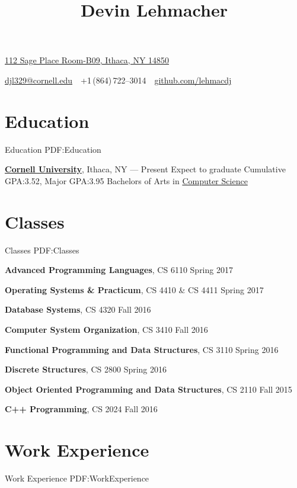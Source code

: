 \documentclass[letterpaper,10pt,oneside]{simpleresume}
\newcommand{\CVAuthor}{Devin Lehmacher}
\newcommand{\CVWebpage}{github.com/lehmacdj}
\begin{document}
\begin{minipage}[t][0pt]{\linewidth}
\pagestyle{empty}

\title{\CVAuthor}

\begin{subtitle}
\href{https://www.google.com/maps/place/112+Sage+Pl+Room-B09,+Ithaca,+NY+14850}
{112 Sage Place Room-B09, Ithaca, NY 14850}
\par
\href{mailto:djl329@cornell.edu}
{djl329@cornell.edu}
\,\SubBulletSymbol\,
+1\,(864)\,722--3014
\,\SubBulletSymbol\,
\href{https://\CVWebpage}
{\CVWebpage}
\end{subtitle}

\begin{body}

\section%
{Education}
{Education}
{PDF:Education}

\href{https://www.cornell.edu}
{\textbf{Cornell University}}, Ithaca, NY
\hfill
{} --- Present
\BulletItem%
Expect to graduate 
\BulletItem%
Cumulative GPA:\@ 3.52, Major GPA:\@ 3.95
\BulletItem%
Bachelors of Arts in
\href{https://www.cs.cornell.edu}{Computer Science}

\section%
{Classes}
{Classes}
{PDF:Classes}

\textbf{Advanced Programming Languages}, CS 6110
\hfill Spring 2017

\textbf{Operating Systems \& Practicum}, CS 4410 \& CS 4411
\hfill Spring 2017

\textbf{Database Systems}, CS 4320
\hfill Fall 2016

\textbf{Computer System Organization}, CS 3410
\hfill Fall 2016

\textbf{Functional Programming and Data Structures}, CS 3110
\hfill Spring 2016

\textbf{Discrete Structures}, CS 2800
\hfill Spring 2016

\textbf{Object Oriented Programming and Data Structures}, CS 2110
\hfill Fall 2015

\textbf{C++ Programming}, CS 2024
\hfill Fall 2016

\section%
{Work Experience}
{Work Experience}
{PDF:WorkExperience}


\end{body}
\end{minipage}
\end{document}
